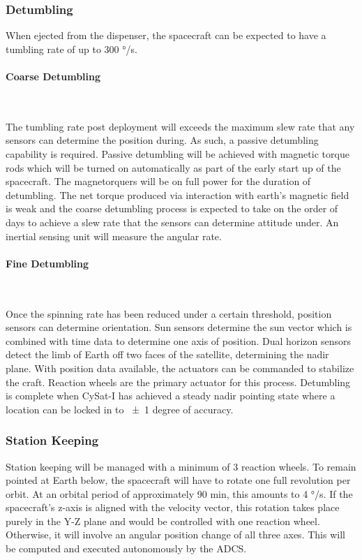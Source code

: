 \documentclass[12pt]{article}
\begin{document}
\subsubsection{Detumbling}

When ejected from the dispenser, the spacecraft can be expected to have a tumbling rate of up to 300 \si[per-mode=symbol]{\degree\per\second}. 

\paragraph{Coarse Detumbling} \

The tumbling rate post deployment will exceeds the maximum slew rate that any sensors can determine the position during. As such, a passive detumbling capability is required. Passive detumbling will be achieved with magnetic torque rods which will be turned on automatically as part of the early start up of the spacecraft. The magnetorquers will be on full power for the duration of detumbling. The net torque produced via interaction with earth’s magnetic field is weak and the coarse detumbling process is expected to take on the order of days to achieve a slew rate that the sensors can determine attitude under. An inertial sensing unit will measure the angular rate.

\paragraph{Fine Detumbling} \

Once the spinning rate has been reduced under a certain threshold, position sensors can determine orientation. Sun sensors determine the sun vector which is combined with time data to determine one axis of position. Dual horizon sensors detect the limb of Earth off two faces of the satellite, determining the nadir plane. With position data available, the actuators can be commanded to stabilize the craft. Reaction wheels are the primary actuator for this process. Detumbling is complete when CySat-I has achieved a steady nadir pointing state where a location can be locked in to \num{+-1} degree of accuracy.

\subsubsection{Station Keeping}

Station keeping will be managed with a minimum of 3 reaction wheels. To remain pointed at Earth below, the spacecraft will have to rotate one full revolution per orbit. At an orbital period of approximately 90 \si{\minute}, this amounts to 4 \si[per-mode=symbol]{\degree\per\second}. If the spacecraft's z-axis is aligned with the velocity vector, this rotation takes place purely in the Y-Z plane and would be controlled with one reaction wheel. Otherwise, it will involve an angular position change of all three axes. This will be computed and executed autonomously by the ADCS.
\end{document}
